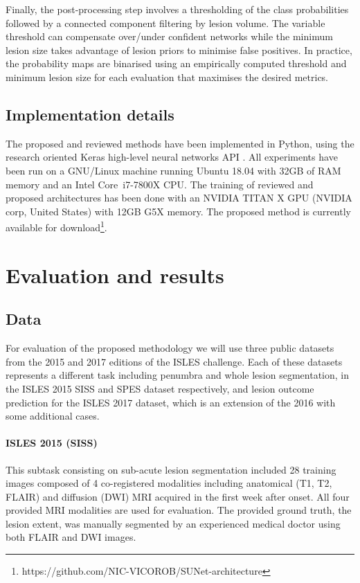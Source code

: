 \documentclass[letterpaper,final,authoryear,3p,times,twocolumn]{elsarticle}
\begin{document}
Finally, the post-processing step involves a thresholding of the class probabilities followed by a connected component filtering by lesion volume. The variable threshold can compensate over/under confident networks while the minimum lesion size takes advantage of lesion priors to minimise false positives. In practice, the probability maps are binarised using an empirically computed threshold and minimum lesion size for each evaluation that maximises the desired metrics.

\subsection{Implementation details}

The proposed and reviewed methods have been implemented in Python, using the research oriented Keras high-level neural networks API \citep{chollet2015keras}. All experiments have been run on a GNU/Linux machine running Ubuntu 18.04 with 32GB of RAM memory and an Intel\textsuperscript{\textregistered} Core\texttrademark~i7-7800X CPU. The training of reviewed and proposed architectures has been done with an NVIDIA TITAN X GPU (NVIDIA corp, United States) with 12GB G5X memory. The proposed method is currently available for download\footnote{https://github.com/NIC-VICOROB/SUNet-architecture}.

\section{Evaluation and results}

\subsection{Data} 
For evaluation of the proposed methodology we will use three public datasets from the 2015 and 2017 editions of the ISLES challenge. Each of these datasets represents a different task including penumbra and whole lesion segmentation, in the ISLES 2015 SISS and SPES dataset respectively, and lesion outcome prediction for the ISLES 2017 dataset, which is an extension of the 2016 with some additional cases.

\paragraph{ISLES 2015 (SISS)} This subtask consisting on sub-acute lesion segmentation included 28 training images composed of 4 co-registered modalities including anatomical (T1, T2, FLAIR) and diffusion (DWI) MRI acquired in the first week after onset. All four provided MRI modalities are used for evaluation. The provided ground truth, the lesion extent, was manually segmented by an experienced medical doctor using both FLAIR and DWI images. 
\end{document}
